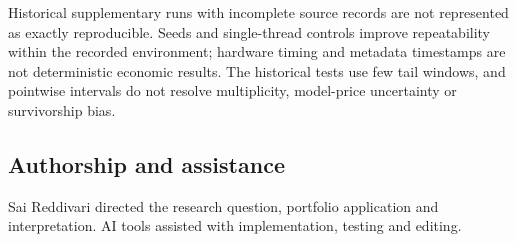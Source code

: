 \documentclass[11pt,a4paper]{article}
\begin{document}
Historical supplementary runs with incomplete source records are not represented as exactly reproducible. Seeds and single-thread controls improve repeatability within the recorded environment; hardware timing and metadata timestamps are not deterministic economic results. The historical tests use few tail windows, and pointwise intervals do not resolve multiplicity, model-price uncertainty or survivorship bias.

\subsection*{Authorship and assistance}
Sai Reddivari directed the research question, portfolio application and interpretation. AI tools assisted with implementation, testing and editing.

\vfill
{}
\end{document}
